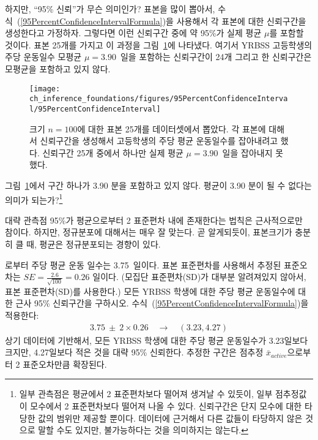 하지만, ``95\% 신뢰''가 무슨 의미인가? 표본을 많이 뽑아서, 수식~(\ref{95PercentConfidenceIntervalFormula})을 사용해서 각 표본에 대한 신뢰구간을 생성한다고 가정하자. 그렇다면 이런 신뢰구간 중에 약 95\%가 실제 평균 $\mu$를 포함할 것이다. 표본 25개를 가지고 이 과정을 그림~\ref{95PercentConfidenceInterval}에 나타냈다. 여기서 YRBSS 고등학생의 주당 운동일수 모평균 $\mu=3.90$~일을 포함하는 신뢰구간이 24개 그리고 한 신뢰구간은 모평균을 포함하고 있지 않다.

\begin{figure}[hht]
   \centering
   \texttt{[image: ch\_inference\_foundations/figures/95PercentConfidenceInterval/95PercentConfidenceInterval]}
   \caption{크기 $n=100$에 대한 표본 25개를  데이터셋에서 뽑았다. 각 표본에 대해서 신뢰구간을 생성해서 고등학생의 주당 평균 운동일수를 잡아내려고 했다. 신뢰구간 25개 중에서 하나만 실제 평균 $\mu = 3.90$~일을 잡아내지 못했다.}
   \label{95PercentConfidenceInterval}
\end{figure}

\begin{exercise}
그림~\ref{95PercentConfidenceInterval}에서 구간 하나가 3.90 분을 포함하고 있지 않다. 평균이 3.90 분이 될 수 없다는 의미가 되는가?\footnote{일부 관측점은 평균에서 2 표준편차보다 떨어져 생겨날 수 있듯이, 일부 점추정값이 모수에서 2 표준편차보다 떨어져 나올 수 있다. 신뢰구간은 단지 모수에 대한 타당한 값의 범위만 제공할 뿐이다. 데이터에 근거해서 다른 값들이 타당하지 않은 것으로 말할 수도 있지만, 불가능하다는 것을 의미하지는 않는다.}
\end{exercise}

대략 관측점 95\%가 평균으로부터 2 표준편차 내에 존재한다는 법칙은 근사적으로만 참이다. 하지만, 정규분포에 대해서는 매우 잘 맞는다. 곧 알게되듯이, 표본크기가 충분히 클 때, 평균은 정규분포되는 경향이 있다.

\begin{example}{
로부터 주당 평균 운동 일수는 3.75~일이다. 표본 표준편차를 사용해서 추정된 표준오차는 $SE=\frac{2.6}{\sqrt{100}} = 0.26$ 일이다. (모집단 표준편차(SD)가 대부분 알려져있지 않아서, 표본 표준편차(SD)를 사용한다.) 모든 YRBSS 학생에 대한 주당 평균 운동일수에 대한 근사 95\% 신뢰구간을 구하시오.}
수식~(\ref{95PercentConfidenceIntervalFormula})을 적용한다:
\begin{eqnarray*}
3.75\ \pm\ 2 \times  0.26 \quad \rightarrow \quad (3.23, 4.27)
\end{eqnarray*}
상기 데이터에 기반해서, 모든 YRBSS 학생에 대한 주당 평균 운동일수가 3.23일보다 크지만, 4.27일보다 적은 것을 대략 95\% 신뢰한다. 추정한 구간은 점추정 $\bar{x}_{active}$으로부터 2 표준오차만큼 확장된다.
\end{example}

